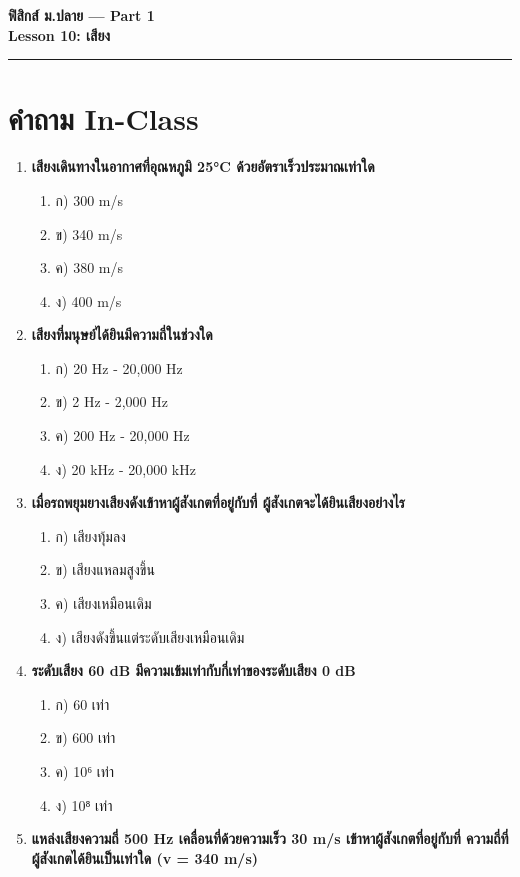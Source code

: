 \documentclass[12pt]{article}
\begin{document}
\begin{center}
{\LARGE\textbf{ฟิสิกส์ ม.ปลาย — Part 1}}\\[0.3em]
{\Large\textbf{Lesson 10: เสียง}}\\[0.5em]
\rule{0.8\linewidth}{0.5pt}
\end{center}
\section*{คำถาม In-Class}
\begin{enumerate}
\item \textbf{เสียงเดินทางในอากาศที่อุณหภูมิ 25°C ด้วยอัตราเร็วประมาณเท่าใด}
\begin{enumerate}
\item ก) 300 m/s
\item ข) 340 m/s
\item ค) 380 m/s
\item ง) 400 m/s
\end{enumerate}
\item \textbf{เสียงที่มนุษย์ได้ยินมีความถี่ในช่วงใด}
\begin{enumerate}
\item ก) 20 Hz - 20,000 Hz
\item ข) 2 Hz - 2,000 Hz
\item ค) 200 Hz - 20,000 Hz
\item ง) 20 kHz - 20,000 kHz
\end{enumerate}
\item \textbf{เมื่อรถพยุมยางเสียงดังเข้าหาผู้สังเกตที่อยู่กับที่ ผู้สังเกตจะได้ยินเสียงอย่างไร}
\begin{enumerate}
\item ก) เสียงทุ้มลง
\item ข) เสียงแหลมสูงขึ้น
\item ค) เสียงเหมือนเดิม
\item ง) เสียงดังขึ้นแต่ระดับเสียงเหมือนเดิม
\end{enumerate}
\item \textbf{ระดับเสียง 60 dB มีความเข้มเท่ากับกี่เท่าของระดับเสียง 0 dB}
\begin{enumerate}
\item ก) 60 เท่า
\item ข) 600 เท่า
\item ค) 10⁶ เท่า
\item ง) 10⁸ เท่า
\end{enumerate}
\item \textbf{แหล่งเสียงความถี่ 500 Hz เคลื่อนที่ด้วยความเร็ว 30 m/s เข้าหาผู้สังเกตที่อยู่กับที่ ความถี่ที่ผู้สังเกตได้ยินเป็นเท่าใด (v = 340 m/s)}

\end{enumerate}
\end{document}
